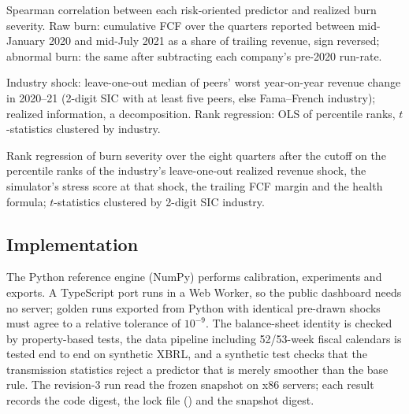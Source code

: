 \begin{table}[!htbp]
\centering\scriptsize
\caption{2020--21 cash burn, predictors frozen on 20 February 2020}
\label{tab:covid}

\par\smallskip
\begin{minipage}{\linewidth}\footnotesize
Spearman correlation between each risk-oriented predictor and realized burn severity. Raw burn: cumulative FCF over the quarters reported between mid-January 2020 and mid-July 2021 as a share of trailing revenue, sign reversed; abnormal burn: the same after subtracting each company's pre-2020 run-rate.
\end{minipage}
\end{table}

\begin{table}[!htbp]
\centering\scriptsize
\caption{Fragility and exposure in 2020}
\label{tab:exposure}

\par\smallskip
\begin{minipage}{\linewidth}\footnotesize
Industry shock: leave-one-out median of peers' worst year-on-year revenue change in 2020--21 (2-digit SIC with at least five peers, else Fama--French industry); realized information, a decomposition. Rank regression: OLS of percentile ranks, $t$-statistics clustered by industry.
\end{minipage}
\end{table}

\begin{table}[!htbp]
\centering\scriptsize
\caption{Fragility given exposure in three downturns}
\label{tab:episodes}

\par\smallskip
\begin{minipage}{\linewidth}\footnotesize
Rank regression of burn severity over the eight quarters after the cutoff on the percentile ranks of the industry's leave-one-out realized revenue shock, the simulator's stress score at that shock, the trailing FCF margin and the health formula; $t$-statistics clustered by 2-digit SIC industry.
\end{minipage}
\end{table}

\subsection{Implementation}
The Python reference engine (NumPy) performs calibration, experiments and exports. A TypeScript port runs in a Web Worker, so the public dashboard needs no server; golden runs exported from Python with identical pre-drawn shocks must agree to a relative tolerance of $10^{-9}$. The balance-sheet identity is checked by property-based tests, the data pipeline including 52/53-week fiscal calendars is tested end to end on synthetic XBRL, and a synthetic test checks that the transmission statistics reject a predictor that is merely smoother than the base rule. The revision-3 run read the frozen snapshot on x86 servers; each result records the code digest, the lock file (\repoid{\LockDigest}) and the snapshot digest.

